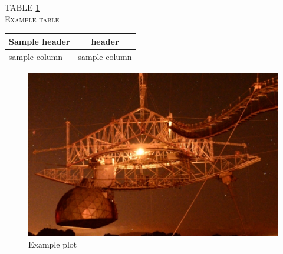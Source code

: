 \documentclass[onecolumn]{emulateapj}
\begin{document}
\begin{table}[!ht]
  \centering TABLE \ref{table: }\\ 
  
  \textsc{Example table}\\
  
  \label{table: }
  \vspace{.5cm}
  \begin{tabular}{lc}

      Sample header & header  \\ 

\hline \hline

sample column & sample column \\ %

  \end{tabular}


\end{table} 

\begin{figure}[!ht]
  \begin{center}
  \includegraphics[scale=0.2]{figures/test_figure.eps}

  \caption{Example plot}

  \label{fig: }
  \end{center}
\end{figure}



\end{document}
